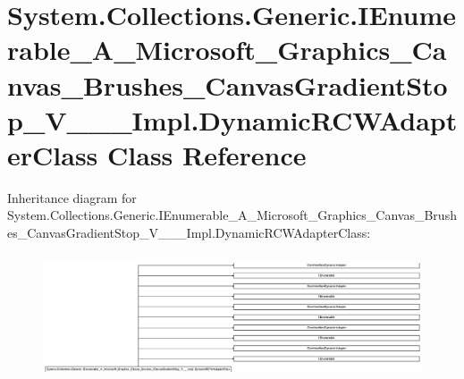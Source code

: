 \hypertarget{class_system_1_1_collections_1_1_generic_1_1_i_enumerable___a___microsoft___graphics___canvas___22f2cd6819050c88abab7a075a0a821b}{}\section{System.\+Collections.\+Generic.\+I\+Enumerable\+\_\+\+A\+\_\+\+Microsoft\+\_\+\+Graphics\+\_\+\+Canvas\+\_\+\+Brushes\+\_\+\+Canvas\+Gradient\+Stop\+\_\+\+V\+\_\+\+\_\+\+\_\+\+Impl.\+Dynamic\+R\+C\+W\+Adapter\+Class Class Reference}
\label{class_system_1_1_collections_1_1_generic_1_1_i_enumerable___a___microsoft___graphics___canvas___22f2cd6819050c88abab7a075a0a821b}
Inheritance diagram for System.\+Collections.\+Generic.\+I\+Enumerable\+\_\+\+A\+\_\+\+Microsoft\+\_\+\+Graphics\+\_\+\+Canvas\+\_\+\+Brushes\+\_\+\+Canvas\+Gradient\+Stop\+\_\+\+V\+\_\+\+\_\+\+\_\+\+Impl.\+Dynamic\+R\+C\+W\+Adapter\+Class\+:\begin{figure}[H]
\begin{center}
\leavevmode
\includegraphics[height=3.733333cm]{class_system_1_1_collections_1_1_generic_1_1_i_enumerable___a___microsoft___graphics___canvas___22f2cd6819050c88abab7a075a0a821b}
\end{center}
\end{figure}

